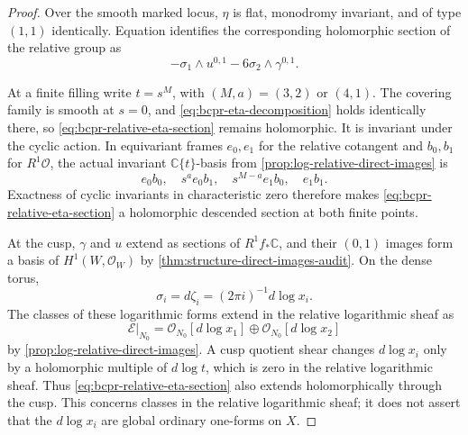 \begin{proof}
Over the smooth marked locus, $\eta$ is flat, monodromy invariant, and of
type $(1,1)$ identically.  Equation
 identifies the corresponding holomorphic
section of the relative group as
\begin{equation}
 -\sigma_1\wedge u^{0,1}-6\sigma_2\wedge\gamma^{0,1}.
\label{eq:bcpr-relative-eta-section}
\end{equation}

At a finite filling write $t=s^M$, with $(M,a)=(3,2)$ or $(4,1)$.
The covering family is smooth at $s=0$, and
\cref{eq:bcpr-eta-decomposition} holds identically there, so
\cref{eq:bcpr-relative-eta-section} remains holomorphic.  It is invariant
under the cyclic action.  In equivariant frames $e_0,e_1$ for the relative
cotangent and $b_0,b_1$ for $R^1\mathcal O$, the actual invariant
$\mathbb C\{t\}$-basis from
\cref{prop:log-relative-direct-images} is
\begin{equation}
 e_0b_0,\quad s^ae_0b_1,\quad
 s^{M-a}e_1b_0,\quad e_1b_1.
\label{eq:bcpr-finite-invariant-basis}
\end{equation}
Exactness of cyclic invariants in characteristic zero therefore makes
\cref{eq:bcpr-relative-eta-section} a holomorphic descended section at
both finite points.

At the cusp, $\gamma$ and $u$ extend as sections of $R^1f_*\mathbb C$,
and their $(0,1)$ images form a basis of $H^1(W,\mathcal O_W)$ by
\cref{thm:structure-direct-images-audit}.  On the dense torus,
\[
 \sigma_i=d\zeta_i=(2\pi i)^{-1}d\log x_i.
\]
The classes of these logarithmic forms extend in the relative logarithmic
sheaf as
\begin{equation}
 \mathcal E|_{N_0}
 =\mathcal O_{N_0}[d\log x_1]\oplus
  \mathcal O_{N_0}[d\log x_2]
\label{eq:bcpr-cusp-log-basis}
\end{equation}
by \cref{prop:log-relative-direct-images}.  A cusp quotient shear changes
$d\log x_i$ only by a holomorphic multiple of $d\log t$, which is zero in
the relative logarithmic sheaf.  Thus
\cref{eq:bcpr-relative-eta-section} also extends holomorphically through
the cusp.  This concerns classes in the relative logarithmic sheaf; it
does not assert that the $d\log x_i$ are global ordinary one-forms on $X$.


\end{proof}
